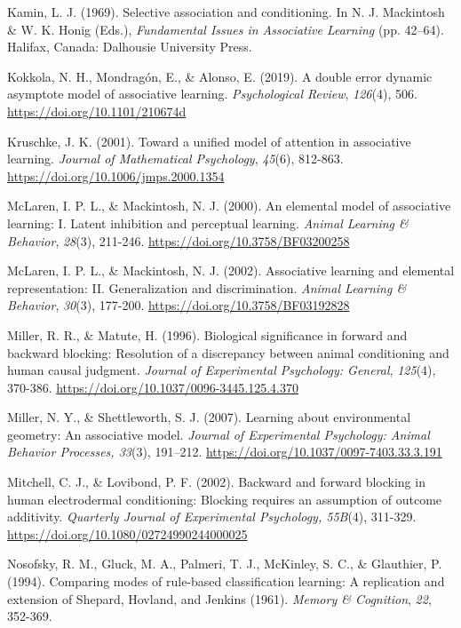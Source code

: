 \documentclass[twocolumn]{article}
\begin{document}
\begin{hangparas}{1em}{1}
Kamin, L. J. (1969). Selective association and conditioning. In N. J.
Mackintosh \& W. K. Honig (Eds.), \emph{Fundamental Issues in
Associative Learning} (pp. 42--64). Halifax, Canada: Dalhousie
University Press.

Kokkola, N. H., Mondragón, E., \& Alonso, E. (2019). A double error
dynamic asymptote model of associative learning. \emph{Psychological
Review}, \emph{126}(4), 506. \url{https://doi.org/10.1101/210674d}

Kruschke, J. K. (2001). Toward a unified model of attention in
associative learning. \emph{Journal of Mathematical Psychology},
\emph{45}(6), 812-863. \url{https://doi.org/10.1006/jmps.2000.1354}

McLaren, I. P. L., \& Mackintosh, N. J. (2000). An elemental model of
associative learning: I. Latent inhibition and perceptual learning.
\emph{Animal Learning \& Behavior}, \emph{28}(3), 211-246.
\url{https://doi.org/10.3758/BF03200258}

McLaren, I. P. L., \& Mackintosh, N. J. (2002). Associative learning and
elemental representation: II. Generalization and discrimination.
\emph{Animal Learning \& Behavior}, \emph{30}(3), 177-200.
\url{https://doi.org/10.3758/BF03192828}

Miller, R. R., \& Matute, H. (1996). Biological significance in forward
and backward blocking: Resolution of a discrepancy between animal
conditioning and human causal judgment. \emph{Journal of Experimental
Psychology: General}, \emph{125}(4), 370-386.
\url{https://doi.org/10.1037/0096-3445.125.4.370}

Miller, N. Y., \& Shettleworth, S. J. (2007). Learning about
environmental geometry: An associative model. \emph{Journal of
Experimental Psychology: Animal Behavior Processes, 33}(3), 191--212.
\href{https://doi.org/10.1037/0097-7403.33.3.191}{https://doi.org/}\href{https://doi.org/10.1037/0097-7403.33.3.191}{10.1037/0097-7403.33.3.191}

Mitchell, C. J., \& Lovibond, P. F. (2002). Backward and forward
blocking in human electrodermal conditioning: Blocking requires an
assumption of outcome additivity. \emph{Quarterly Journal of
Experimental Psychology, 55B}(4), 311-329.
\url{https://doi.org/10.1080/02724990244000025}

Nosofsky, R. M., Gluck, M. A., Palmeri, T. J., McKinley, S. C., \&
Glauthier, P. (1994). Comparing modes of rule-based classification
learning: A replication and extension of Shepard, Hovland, and Jenkins
(1961). \emph{Memory \& Cognition}, \emph{22}, 352-369.


\end{hangparas}
\end{document}
